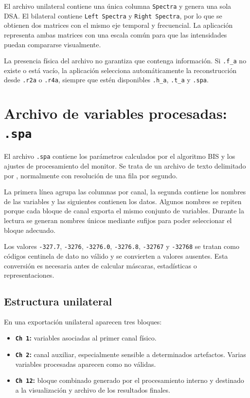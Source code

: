 \documentclass[
  spanish,
  a4paper,
  12pt,
  twoside]{memoir}
\providecommand{\tightlist}{%
  \setlength{\itemsep}{0pt}\setlength{\parskip}{0pt}}
\begin{document}
El archivo unilateral contiene una única columna \texttt{Spectra} y
genera una sola DSA. El bilateral contiene \texttt{Left\ Spectra} y
\texttt{Right\ Spectra}, por lo que se obtienen dos matrices con el
mismo eje temporal y frecuencial. La aplicación representa ambas
matrices con una escala común para que las intensidades puedan
compararse visualmente.

La presencia física del archivo no garantiza que contenga información.
Si \texttt{.f\_a} no existe o está vacío, la aplicación selecciona
automáticamente la reconstrucción desde \texttt{.r2a} o \texttt{.r4a},
siempre que estén disponibles \texttt{.h\_a}, \texttt{.t\_a} y
\texttt{.spa}.

\chapter{\texorpdfstring{Archivo de variables procesadas:
\texttt{.spa}}{Archivo de variables procesadas: .spa}}\label{archivo-de-variables-procesadas-.spa}

El archivo \texttt{.spa} contiene los parámetros calculados por el
algoritmo BIS y los ajustes de procesamiento del monitor. Se trata de un
archivo de texto delimitado por \texttt{\textbar{}}, normalmente con
resolución de una fila por segundo.

La primera línea agrupa las columnas por canal, la segunda contiene los
nombres de las variables y las siguientes contienen los datos. Algunos
nombres se repiten porque cada bloque de canal exporta el mismo conjunto
de variables. Durante la lectura se generan nombres únicos mediante
sufijos para poder seleccionar el bloque adecuado.

Los valores \texttt{-327.7}, \texttt{-3276}, \texttt{-3276.0},
\texttt{-3276.8}, \texttt{-32767} y \texttt{-32768} se tratan como
códigos centinela de dato no válido y se convierten a valores ausentes.
Esta conversión es necesaria antes de calcular máscaras, estadísticas o
representaciones.

\section{Estructura unilateral}\label{estructura-unilateral}

En una exportación unilateral aparecen tres bloques:

\begin{itemize}
\tightlist
\item
  \textbf{\texttt{Ch\ 1}:} variables asociadas al primer canal físico.
\item
  \textbf{\texttt{Ch\ 2}:} canal auxiliar, especialmente sensible a
  determinados artefactos. Varias variables procesadas aparecen como no
  válidas.
\item
  \textbf{\texttt{Ch\ 12}:} bloque combinado generado por el
  procesamiento interno y destinado a la visualización y archivo de los
  resultados finales.
\end{itemize}
\end{document}
